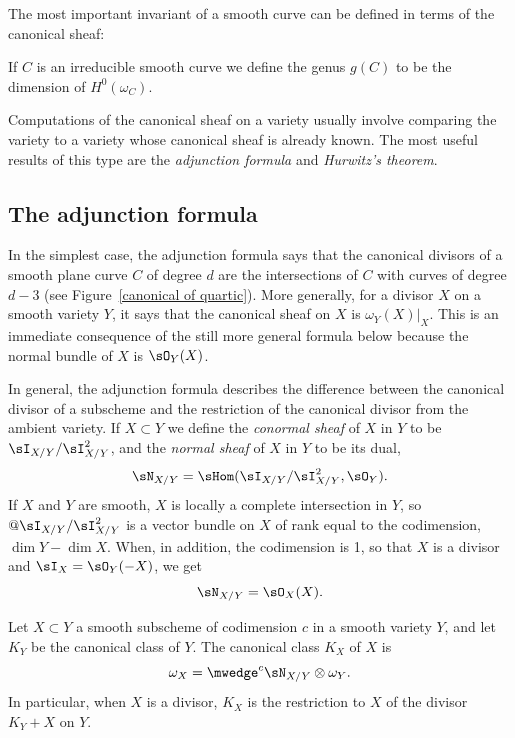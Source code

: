 The most important invariant of a smooth curve can be defined in terms of the canonical sheaf:

\begin{definition}
If $C$ is an irreducible smooth curve we define the genus $g(C)$ to be the dimension of $H^0(\omega_C)$.
\unif
\end{definition}

Computations of the canonical sheaf on a variety usually involve
comparing the variety to a variety 
whose
canonical sheaf is already known. The most useful results of this type
are  the \emph{adjunction formula}
and \emph{Hurwitz's theorem}. 

\subsection*{The adjunction formula}%

In the simplest case, the adjunction formula says that the canonical divisors of a smooth plane 
curve $C$ of degree $d$ are the intersections of $C$ with curves of degree $d-3$ 
(see Figure~\ref{canonical of quartic}). 
More generally, for a divisor $X$ on a smooth variety $Y$, it says that
the canonical sheaf on $X$ is $\omega_Y(X)|_X$. This is an immediate consequence of
the still more general formula below because the normal bundle of $X$ is $\sO_Y(X)$.

In general, the adjunction formula describes the difference between the canonical divisor of
a  subscheme and the restriction of the canonical divisor from the ambient variety.
If $X\subset Y$ we define the \emph{conormal sheaf} of $X$ in $Y$ to be $\sI_{X/Y}/\sI_{X/Y}^{2}$,
and the \emph{normal sheaf} of $X$ in $Y$ to be its dual, 
$$
\sN_{X/Y} = \sHom(\sI_{X/Y}/\sI_{X/Y}^{2}, \sO_{Y}).
$$
If $X$ and $Y$ are smooth, $X$ is locally a complete intersection in $Y$, so
 $@\sI_{X/Y}/\sI_{X/Y}^{2}$ 
is a vector bundle on $X$ of rank equal to the codimension, $\dim Y -\dim X$.
 When, in addition, the codimension is 1, so that $X$ is a divisor and $\sI_{X} = \sO_{Y}(-X)$, we get
 $$
 \sN_{X/Y} = \sO_{X}(X).
 $$


\begin{proposition}\label{adjunction}
 Let $X\subset Y$ a smooth subscheme of codimension $c$ in a smooth variety $Y$, and let $K_{Y}$ be the canonical class of $Y$. The canonical class $K_X$ of $X$ is 
%
 $$
 \omega_{X} = \mwedge^{c} \sN_{X/Y} \otimes \omega_{Y}.
 $$
In particular, when $X$ is a divisor, $K_{X}$ is the restriction to $X$ of the divisor $K_{Y}+X$ on $Y$.
\end{proposition}

